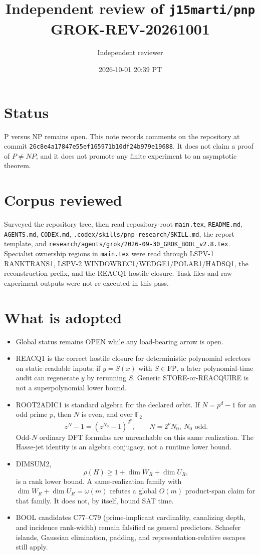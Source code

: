 \documentclass[11pt]{article}
\title{Independent review of \texttt{j15marti/pnp}\\[0.3em]
\large GROK-REV-20261001}
\author{Independent reviewer}
\date{2026-10-01 20:39 PT}
\begin{document}
\maketitle

\section*{Status}
P versus NP remains open. This note records comments on the repository at commit
\texttt{26c8e4a17847e55ef165971b10df24b979e19688}. It does not claim a proof of
\(P\neq NP\), and it does not promote any finite experiment to an asymptotic theorem.

\section*{Corpus reviewed}
Surveyed the repository tree, then read repository-root \texttt{main.tex},
\texttt{README.md}, \texttt{AGENTS.md}, \texttt{CODEX.md},
\texttt{.codex/skills/pnp-research/SKILL.md}, the report template, and
\texttt{research/agents/grok/2026-09-30\_GROK\_BOOL\_v2.8.tex}.
Specialist ownership regions in \texttt{main.tex} were read through LSPV-1
RANKTRANS1, LSPV-2 WINDOWREC1/WEDGE1/POLAR1/HADSQ1, the reconstruction prefix,
and the REACQ1 hostile closure. Task files and raw experiment outputs were not
re-executed in this pass.

\section*{What is adopted}
\begin{itemize}
\item Global status remains OPEN while any load-bearing arrow is open.
\item REACQ1 is the correct hostile closure for deterministic polynomial selectors
on static readable inputs: if \(y=S(x)\) with \(S\in\mathrm{FP}\), a later
polynomial-time audit can regenerate \(y\) by rerunning \(S\). Generic
STORE-or-REACQUIRE is not a superpolynomial lower bound.
\item ROOT2ADIC1 is standard algebra for the declared orbit. If \(N=p^d-1\) for an
odd prime \(p\), then \(N\) is even, and over \(\mathbb{F}_2\)
\[
z^N-1=(z^{N_0}-1)^{2^\nu},\qquad N=2^\nu N_0,\ N_0\text{ odd}.
\]
Odd-\(N\) ordinary DFT formulas are unreachable on this same realization.
The Hasse-jet identity is an algebra conjugacy, not a runtime lower bound.
\item DIMSUM2,
\[
\rho(H)\ge 1+\dim W_R+\dim U_R,
\]
is a rank lower bound. A same-realization family with
\(\dim W_R+\dim U_R=\omega(m)\) refutes a global \(O(m)\) product-span claim for
that family. It does not, by itself, bound SAT time.
\item BOOL candidates C77--C79 (prime-implicant cardinality, canalizing depth, and
incidence rank-width) remain falsified as general predictors. Schaefer islands,
Gaussian elimination, padding, and representation-relative escapes still apply.
\end{itemize}
\end{document}
